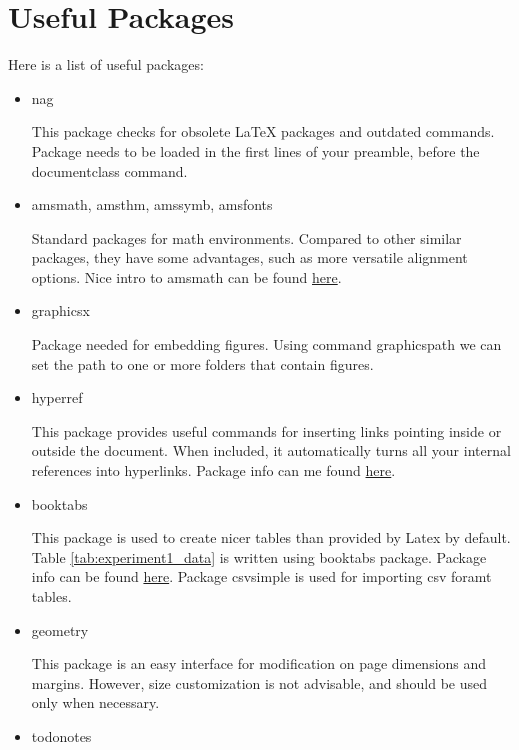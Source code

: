\section{Useful Packages}
\label{sec:packages}

Here is a list of useful packages:
\begin{itemize}
	\item{nag}
	
	This package checks for obsolete LaTeX packages and outdated commands. Package needs to be loaded in the first lines of your preamble, before the documentclass command.
	
	\item{amsmath, amsthm, amssymb, amsfonts}
	
	Standard packages for math environments. Compared to other similar packages, they have some advantages, such as more versatile alignment options. Nice intro to amsmath can be found \href{https://www.sharelatex.com/learn/Aligning_equations_with_amsmath}{here}.
		
	\item{graphicsx}
	
	Package needed for embedding figures. Using command graphicspath we can set the path to one or more folders that contain figures. 
			
	\item{hyperref}
	
	This package provides useful commands for inserting links pointing inside or outside the document. When included, it automatically turns all your internal references into hyperlinks. Package info can me found \href{https://en.wikibooks.org/wiki/LaTeX/Hyperlinks}{here}.
	
	\item{booktabs}
	
	This package is used to create nicer tables than provided by Latex by default. Table \ref{tab:experiment1_data} is written using booktabs package. Package info can be found \href{http://ctan.ijs.si/tex-archive/macros/latex/contrib/booktabs/booktabs.pdf}{here}.  Package csvsimple is used for importing csv foramt tables.
	
	\item{geometry}
	
	This package is an easy interface for modification on page dimensions and margins. However, size customization is not advisable, and should be used only when necessary.
	
	\item{todonotes}
	

\end{itemize}
